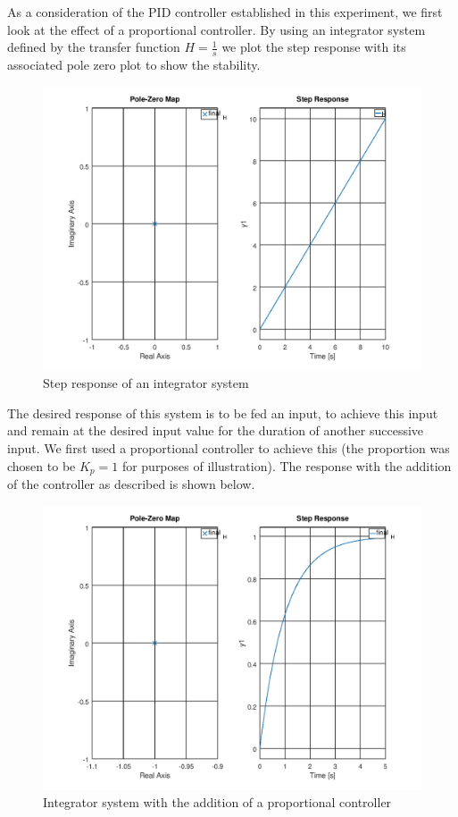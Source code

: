 \documentclass[a4paper, 12pt]{article}
\begin{document}
As a consideration of the PID controller established in this experiment, we
first look at the effect of a proportional controller. By using an integrator
system defined by the transfer function $H = \frac{1}{s}$ we plot the step
response with its associated pole zero plot to show the stability.

\begin{figure}[H]
	\centering
	\includegraphics[width=\textwidth]{integrator_system.png}
	\caption{Step response of an integrator system}
	\label{fig:integrator_system}
\end{figure}

The desired response of this system is to be fed an input, to achieve this
input and remain at the desired input value for the duration of another
successive input. We first used a proportional controller to achieve this (the
proportion was chosen to be $K_p = 1$ for purposes of illustration). The
response with the addition of the controller as described is shown below.

\begin{figure}[H]
	\centering
	\includegraphics[width=\textwidth]{integrator_system_proportional_controller.png}
	\caption{Integrator system with the addition of a proportional controller}
	\label{fig:integrator_system_proportional_controller}
\end{figure}
\end{document}
